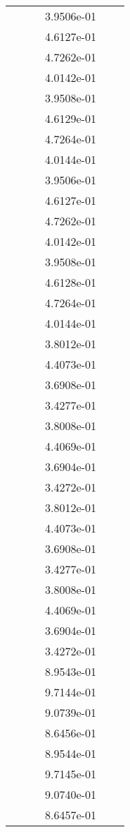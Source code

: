 \begin{xltabular}{\textwidth}{r|rS[table-format=1.3e+2]S[table-format=1.4e+2]S[table-format=1.4e+2]S[table-format=-1.5]}
&  &  & 3.9506e-01 & & \\
&  &  & 4.6127e-01 & & \\
&  &  & 4.7262e-01 & & \\
&  &  & 4.0142e-01 & & \\
&  &  & 3.9508e-01 & & \\
&  &  & 4.6129e-01 & & \\
&  &  & 4.7264e-01 & & \\
&  &  & 4.0144e-01 & & \\
&  &  & 3.9506e-01 & & \\
&  &  & 4.6127e-01 & & \\
&  &  & 4.7262e-01 & & \\
&  &  & 4.0142e-01 & & \\
&  &  & 3.9508e-01 & & \\
&  &  & 4.6128e-01 & & \\
&  &  & 4.7264e-01 & & \\
&  &  & 4.0144e-01 & & \\
&  &  & 3.8012e-01 & & \\
&  &  & 4.4073e-01 & & \\
&  &  & 3.6908e-01 & & \\
&  &  & 3.4277e-01 & & \\
&  &  & 3.8008e-01 & & \\
&  &  & 4.4069e-01 & & \\
&  &  & 3.6904e-01 & & \\
&  &  & 3.4272e-01 & & \\
&  &  & 3.8012e-01 & & \\
&  &  & 4.4073e-01 & & \\
&  &  & 3.6908e-01 & & \\
&  &  & 3.4277e-01 & & \\
&  &  & 3.8008e-01 & & \\
&  &  & 4.4069e-01 & & \\
&  &  & 3.6904e-01 & & \\
&  &  & 3.4272e-01 & & \\
&  &  & 8.9543e-01 & & \\
&  &  & 9.7144e-01 & & \\
&  &  & 9.0739e-01 & & \\
&  &  & 8.6456e-01 & & \\
&  &  & 8.9544e-01 & & \\
&  &  & 9.7145e-01 & & \\
&  &  & 9.0740e-01 & & \\
&  &  & 8.6457e-01 & & \\

\end{xltabular}
